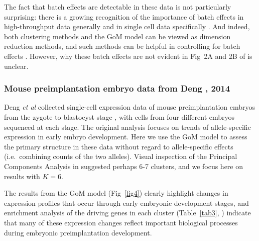 \documentclass[10pt,letterpaper]{article}
\begin{document}
The fact that batch effects are detectable in these data is not particularly surprising: there is a growing recognition of the importance of batch effects in high-throughput data generally \cite{Leek2010, Danielsson2015} and in single cell data specifically \cite{Hicks2015, Gilad2015}. And indeed, both clustering methods and the GoM model can be viewed as dimension reduction methods, and such methods can be helpful in controlling for batch effects \cite{Leek2007, Stegle2012}. However, why these batch effects are not evident in Fig~2A and 2B of \cite{Jaitin2014} is unclear.


\subsubsection*{Mouse preimplantation embryo data from Deng , 2014}

Deng \textit{et al} collected single-cell expression data of mouse preimplantation embryos from the zygote to blastocyst stage \cite{Deng2014}, with cells from four different embryos sequenced at each stage. The original analysis \cite{Deng2014} focuses on trends of allele-specific expression in early embryo development. Here we use the GoM model to assess the primary structure in these data without regard to allele-specific effects (i.e.~combining counts of the two alleles). Visual inspection of the Principal Components Analysis in \cite{Deng2014} suggested perhaps 6-7 clusters, and we focus here on results with $K=6$.

The results from the GoM model (Fig~\ref{fig4}) clearly highlight changes in expression profiles that occur through early embryonic development stages, and enrichment analysis of the driving genes in each cluster (Table~\ref{tab3},  ) indicate that many of these expression changes reflect important biological processes during embryonic preimplantation development.

%
\end{document}
